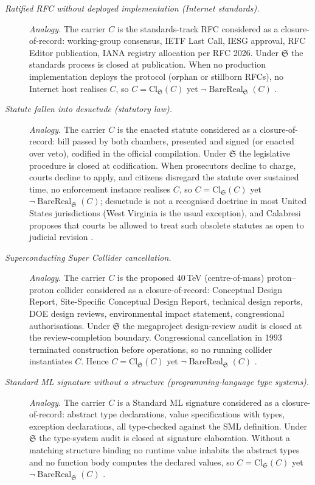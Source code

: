 \begin{description}
\item[\emph{Ratified RFC without deployed
implementation (Internet standards).}] \textit{Analogy.}
The carrier \(C\) is the standards-track RFC
considered as a closure-of-record: working-group
consensus, IETF Last Call, IESG approval, RFC
Editor publication, IANA registry allocation per
RFC 2026.  Under \(\mathfrak S\) the standards
process is closed at publication.  When no
production implementation deploys the protocol
(orphan or stillborn RFCs), no Internet host
realises \(C\), so \(C=\mathrm{Cl}_{\mathfrak S}
(C)\) yet \(\neg\operatorname{BareReal}_{\mathfrak
S}(C)\) \citep{Bradner1996RFC2026}.

\item[\emph{Statute fallen into desuetude
(statutory law).}] \textit{Analogy.}
The carrier \(C\) is the enacted statute
considered as a closure-of-record: bill passed by
both chambers, presented and signed (or enacted
over veto), codified in the official compilation.
Under \(\mathfrak S\) the legislative procedure is
closed at codification.  When prosecutors decline
to charge, courts decline to apply, and citizens
disregard the statute over sustained time, no
enforcement instance realises \(C\), so
\(C=\mathrm{Cl}_{\mathfrak S}(C)\) yet \(\neg
\operatorname{BareReal}_{\mathfrak S}(C)\); desuetude is not a recognised doctrine in
most United States jurisdictions (West Virginia is the usual
exception), and Calabresi proposes that courts be allowed to treat
such obsolete statutes as open to judicial revision \citep{Calabresi1982Common}.

\item[\emph{Superconducting Super Collider cancellation.}] \textit{Analogy.}
The carrier \(C\) is the proposed 40\,TeV
(centre-of-mass) proton--proton collider considered as a
closure-of-record: Conceptual Design Report,
Site-Specific
Conceptual Design Report, technical design
reports, DOE design reviews, environmental impact
statement, congressional authorisations.  Under
\(\mathfrak S\) the megaproject design-review
audit is closed at the review-completion
boundary.  Congressional cancellation in 1993
terminated construction before operations, so no
running collider instantiates \(C\).  Hence
\(C=\mathrm{Cl}_{\mathfrak S}(C)\) yet
\(\neg\operatorname{BareReal}_{\mathfrak S}(C)\)
\citep{Riordan2015Tunnel}.

\item[\emph{Standard {ML} signature without a
structure (programming-language type systems).}] \textit{Analogy.}
The carrier \(C\) is a Standard ML signature
considered as a closure-of-record: abstract type
declarations, value specifications with types,
exception declarations, all type-checked against
the SML definition.  Under \(\mathfrak S\) the
type-system audit is closed at signature
elaboration.  Without a matching structure binding
no runtime value inhabits the abstract types and
no function body computes the declared values, so
\(C=\mathrm{Cl}_{\mathfrak S}(C)\) yet \(\neg
\operatorname{BareReal}_{\mathfrak S}(C)\)
\citep{MacQueen1984Modules}.
\end{description}
\endgroup

